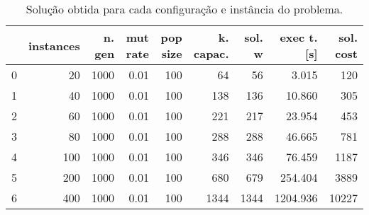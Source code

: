 \documentclass{article}
\begin{document}
\begin{table}
\centering
\begin{tabular}{lrrrrrrrr}
\toprule
{} &  instances &  n. gen &  mut rate &  pop size &  k. capac. &  sol. w &  exec t. [s] &  sol. cost \\
\midrule
0 &         20 &    1000 &      0.01 &       100 &         64 &      56 &        3.015 &        120 \\
1 &         40 &    1000 &      0.01 &       100 &        138 &     136 &       10.860 &        305 \\
2 &         60 &    1000 &      0.01 &       100 &        221 &     217 &       23.954 &        453 \\
3 &         80 &    1000 &      0.01 &       100 &        288 &     288 &       46.665 &        781 \\
4 &        100 &    1000 &      0.01 &       100 &        346 &     346 &       76.459 &       1187 \\
5 &        200 &    1000 &      0.01 &       100 &        680 &     679 &      254.404 &       3889 \\
6 &        400 &    1000 &      0.01 &       100 &       1344 &    1344 &     1204.936 &      10227 \\
\bottomrule
\end{tabular}
\caption{Solução obtida para cada configuração e instância do problema.}
\label{table:all-data}
\end{table}
\end{document}
